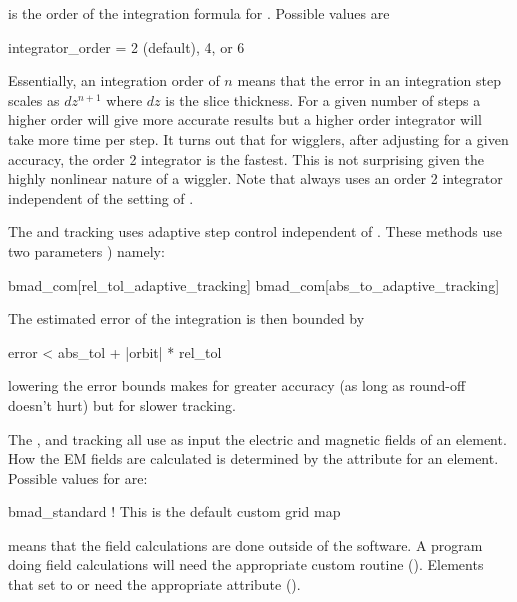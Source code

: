  is the order of the integration formula for 
. Possible values are
\begin{example}
  integrator_order = 2 (default), 4, or 6
\end{example}
Essentially, an integration order of $n$ means that the error in an
integration step scales as $dz^{n+1}$ where $dz$ is the slice
thickness.  For a given number of steps a higher order will give more
accurate results but a higher order integrator will take more time per
step. It turns out that for wigglers, after adjusting 
for a given accuracy, the order 2 integrator is the fastest. This is
not surprising given the highly nonlinear nature of a wiggler. Note
that  always uses an order 2 integrator
independent of the setting of .

The  and  tracking uses adaptive step
control independent of . These methods use two  parameters
) namely:
\begin{example}
  bmad_com[rel_tol_adaptive_tracking]
  bmad_com[abs_to_adaptive_tracking]
\end{example}
The estimated error of the integration is then bounded by
\begin{example}
  error < abs_tol + |orbit| * rel_tol
\end{example}
lowering the error bounds makes for greater accuracy (as long as round-off 
doesn't hurt) but for slower tracking. 

The , and  tracking all use
as input the electric and magnetic fields of an element. How the EM fields
are calculated is determined by the  attribute for an element.
Possible values for  are:
\begin{example}
  bmad_standard     ! This is the default
  custom
  grid
  map  
\end{example}
 means that the field calculations are done outside of the
\bmad software. A program doing  field calculations will
need the appropriate custom routine (). Elements
that set  to  or  need the appropriate
 attribute ().  


